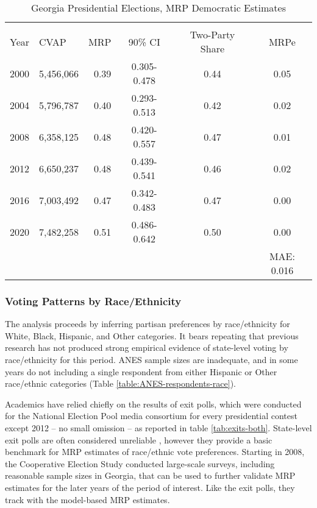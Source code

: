 \begin{table}[ht]
\centering
\begin{threeparttable}
\caption{Georgia Presidential Elections, MRP Democratic Estimates}  
\label{tab:MRP-GA}
\begin{tabular}{rlrccc}
  \hline \\ \vspace{0.5em}
Year & CVAP & MRP & 90\% CI & Two-Party Share & MRPe \\ 
  \hline
2000 & 5,456,066 & 0.39 & 0.305-0.478 & 0.44 & 0.05 \\ 
  2004 & 5,796,787 & 0.40 & 0.293-0.513 & 0.42 & 0.02 \\ 
  2008 & 6,358,125 & 0.48 & 0.420-0.557 & 0.47 & 0.01 \\ 
  2012 & 6,650,237 & 0.48 & 0.439-0.541 & 0.46 & 0.02 \\ 
  2016 & 7,003,492 & 0.47 & 0.342-0.483 & 0.47 & 0.00 \\ 
  2020 & 7,482,258 & 0.51 & 0.486-0.642 & 0.50 & 0.00 \\ 
   \hline \vspace{0.5em}
     &          &       &       &     &        MAE: 0.016   \\
\end{tabular}
\end{threeparttable}
\end{table}

\subsubsection{Voting Patterns by Race/Ethnicity}

The analysis proceeds by inferring partisan preferences by race/ethnicity for White, Black, Hispanic, and Other categories. It bears repeating that previous research has not produced strong empirical evidence of state-level voting by race/ethnicity for this period. ANES sample sizes are inadequate, and in some years do not including a single respondent from either Hispanic or Other race/ethnic categories (Table \ref{table:ANES-respondents-race}). 


Academics have relied chiefly on the results of exit polls, which were conducted for the National Election Pool media consortium for every presidential contest except 2012 -- no small omission -- as reported in table \ref{tab:exits-both}. State-level exit polls are often considered unreliable \citep{wright_misreports_1990, barreto_controversies_2006, morin_report_2005}, however they provide a basic benchmark for MRP estimates of race/ethnic vote preferences. Starting in 2008, the Cooperative Election Study conducted large-scale surveys, including reasonable sample sizes in Georgia, that can be used to further validate MRP estimates for the later years of the period of interest. Like the exit polls, they track with the model-based MRP estimates.

